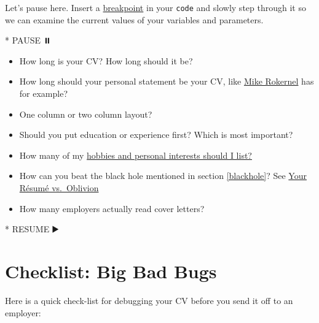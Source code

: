 \documentclass[
]{book}
\newenvironment{Shaded}{\begin{snugshade}}{\end{snugshade}}
\newcommand{\NormalTok}[1]{#1}
\newcommand{\SpecialStringTok}[1]{\textcolor[rgb]{0.31,0.60,0.02}{#1}}
\providecommand{\tightlist}{%
  \setlength{\itemsep}{0pt}\setlength{\parskip}{0pt}}
\begin{document}
Let's pause here. Insert a \href{https://en.wikipedia.org/wiki/Breakpoint}{breakpoint} in your \texttt{code} and slowly step through it so we can examine the current values of your variables and parameters.

\begin{Shaded}
\begin{Highlighting}[]
\SpecialStringTok{* }\NormalTok{PAUSE ⏸️}
\end{Highlighting}
\end{Shaded}

\begin{itemize}
\tightlist
\item
  How long is your CV? How long should it be?
\item
  How long should your personal statement be your CV, like \href{https://www.cdyf.me/Mike_Rokernel.pdf}{Mike Rokernel} has for example?
\item
  One column or two column layout?
\item
  Should you put education or experience first? Which is most important?
\item
  How many of my \href{https://www.reed.co.uk/career-advice/hobbies-and-interests-should-i-include-them-in-my-cv}{hobbies and personal interests should I list?} \citep{hobbies}
\item
  How can you beat the black hole mentioned in section \ref{blackhole}? See \href{https://www.wsj.com/articles/SB10001424052970204624204577178941034941330}{Your Résumé vs.~Oblivion} \citep{oblivion}
\item
  How many employers actually read cover letters?
\end{itemize}

\begin{Shaded}
\begin{Highlighting}[]
\SpecialStringTok{* }\NormalTok{RESUME ▶️}
\end{Highlighting}
\end{Shaded}

\hypertarget{checklist}{%
\section{Checklist: Big Bad Bugs}\label{checklist}}

Here is a quick check-list for debugging your CV before you send it off to an employer:
\end{document}
